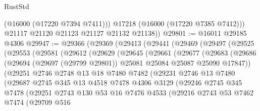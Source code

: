 \begin{lexlean}{RustStd}
\begin{coremodule}
            (@16000 (@17220 @7394 @7411)))
          @17218
          (@16000 (@17220 @7385 @7412)))
        @21117
        @21120
        @21123
        @21127
        @21132
        @21138))
@29801 := @16011 @29185 @4306
@29947 := @29366
    (@29369
      (@29413
        (@29441
          (@29469
            (@29497
              (@29525
                (@29553
                  (@29581
                    (@29612
                      (@29629
                        (@29645
                          (@29661
                            (@29677
                              (@29683
                                (@29686
                                  (@29694
                                    (@29697 (@29799 @29801))
                                    @25081
                                    @25084
                                    @25087
                                    @25090
                                    @17847))
                                (@29251
                                  @2746
                                  @2748
                                  @13
                                  @18
                                  @7480
                                  @7482
                                  (@29231
                                    @2746
                                    @13
                                    @7480
                                    (@29687
                                      @2745
                                      @345
                                      @13
                                      @4518
                                      @7478
                                      @4306
                                      @3129
                                      (@29246
                                        @2745
                                        @345
                                        @7478
                                        (@29251
                                          @2743
                                          @130
                                          @53
                                          @16
                                          @7476
                                          @4533
                                          (@29216
                                            @2743
                                            @53
                                            @7462
                                            @7474
                                            (@29709
                                              @516

\end{coremodule}
\end{lexlean}
